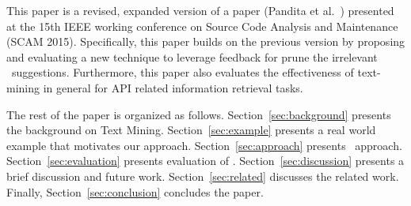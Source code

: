 This paper is a revised, expanded version of a paper (Pandita et al.~\cite{pandita2015discovering}) presented at the 15th
IEEE working conference on Source Code Analysis and Maintenance (SCAM 2015).
Specifically, this paper builds on the previous version by proposing and evaluating a new technique to leverage feedback for prune the irrelevant \tool\ suggestions. Furthermore, this paper also evaluates the effectiveness of text-mining in general for API related information retrieval tasks.

The rest of the paper is organized as follows.
Section~\ref{sec:background} presents the background on Text Mining.
Section~\ref{sec:example} presents a real world example that motivates our approach. Section~\ref{sec:approach} presents \tool\ approach.
Section~\ref{sec:evaluation} presents evaluation of \tool.
Section~\ref{sec:discussion} presents a brief discussion and future work.
Section~\ref{sec:related} discusses the related work.
Finally, Section~\ref{sec:conclusion} concludes the paper.

